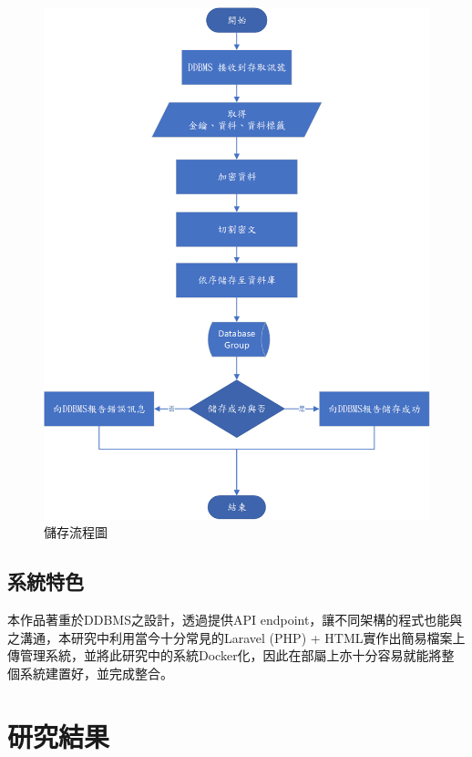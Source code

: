 \documentclass[11pt,twocolumn]{article}
\begin{document}
\begin{figure}[h]
\centering
\includegraphics[scale=0.4]{Fig.2.png}
\caption{儲存流程圖}
\end{figure}

\subsection{系統特色}
本作品著重於DDBMS之設計，透過提供API endpoint，讓不同架構的程式也能與之溝通，本研究中利用當今十分常見的Laravel (PHP) + HTML實作出簡易檔案上傳管理系統，並將此研究中的系統Docker化，因此在部屬上亦十分容易就能將整個系統建置好，並完成整合。
\newpage
\section{研究結果}
\end{document}
